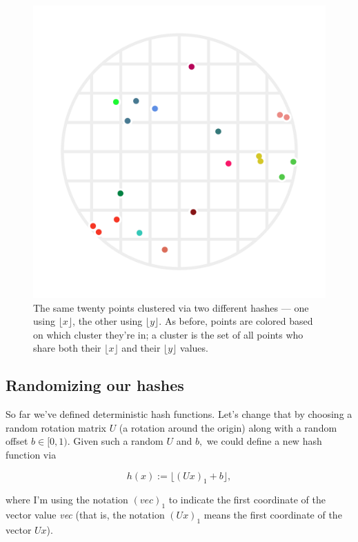 \documentclass[20pt,]{extarticle}
\begin{document}
\begin{figure}
\centering
\includegraphics{images/pdfs/lsh_image3.pdf}
\caption{The same twenty points clustered via two different hashes ---
one using \(\lfloor x\rfloor\), the other using \(\lfloor y\rfloor.\) As
before, points are colored based on which cluster they're in; a cluster
is the set of all points who share both their \(\lfloor x\rfloor\) and
their \(\lfloor y\rfloor\) values.}\label{fig:fig3}
\end{figure}

\subsection{Randomizing our hashes}\label{randomizing-our-hashes}

So far we've defined deterministic hash functions. Let's change that by
choosing a random rotation matrix \(U\) (a rotation around the origin)
along with a random offset \(b \in [0, 1).\) Given such a random \(U\)
and \(b,\) we could define a new hash function via

\[ h(x) := \lfloor (Ux)_1 + b \rfloor, \]

where I'm using the notation \(( \textit{vec} )_1\) to indicate the
first coordinate of the vector value \emph{vec} (that is, the notation
\((Ux)_1\) means the first coordinate of the vector \(Ux\)).
\end{document}
